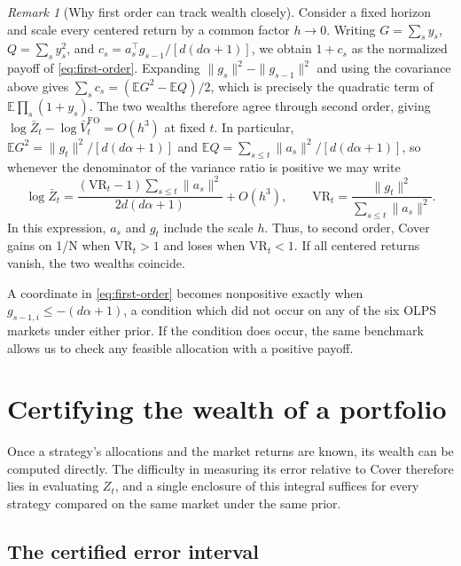 \documentclass{article}
\numberwithin{equation}{section}
\theoremstyle{remark}
\newtheorem{remark}[theorem]{Remark}
\newcommand{\E}{\mathbb E}
\begin{document}
\begin{remark}[Why first order can track wealth closely]
Consider a fixed horizon and scale every centered return by a common factor
$h\to0$. Writing $G=\sum_s y_s$, $Q=\sum_s y_s^2$, and
$c_s=a_s^\top g_{s-1}/[d(d\alpha+1)]$, we obtain $1+c_s$ as the
normalized payoff of \eqref{eq:first-order}. Expanding
$\|g_s\|^2-\|g_{s-1}\|^2$ and using the covariance above gives
$\sum_s c_s=(\E G^2-\E Q)/2$, which is precisely the quadratic term
of $\E\prod_s(1+y_s)$. The two wealths therefore agree through second
order, giving $\log\bar Z_t-\log\bar V_t^{\mathrm{FO}}=O(h^3)$ at
fixed $t$. In particular, $\E G^2=\|g_t\|^2/[d(d\alpha+1)]$ and
$\E Q=\sum_{s\le t}\|a_s\|^2/[d(d\alpha+1)]$, so whenever the
denominator of the variance ratio is positive we may write
\begin{equation}\label{eq:second-order}
 \log\bar Z_t =
 \frac{(\mathrm{VR}_t-1)\sum_{s\le t}\|a_s\|^2}{2d(d\alpha+1)}
 +O(h^3),\qquad
 \mathrm{VR}_t=\frac{\|g_t\|^2}{\sum_{s\le t}\|a_s\|^2}.
\end{equation}
In this expression, $a_s$ and $g_t$ include the scale $h$. Thus, to
second order, Cover gains on 1/N when $\mathrm{VR}_t>1$ and loses when $\mathrm{VR}_t<1$.
If all centered returns vanish, the two wealths coincide.
\end{remark}

A coordinate in \eqref{eq:first-order} becomes nonpositive exactly when
$g_{s-1,i}\le-(d\alpha+1)$, a condition which did not occur on any of
the six OLPS markets under either prior. If the condition does occur,
the same benchmark allows us to check any feasible allocation with a
positive payoff.

\section{Certifying the wealth of a portfolio}
\label{sec:certificate}

Once a strategy's allocations and the market returns are known, its
wealth can be computed directly. The difficulty in measuring its error
relative to Cover therefore lies in evaluating $Z_t$, and a single
enclosure of this integral suffices for every strategy compared on the
same market under the same prior.

\subsection{The certified error interval}
\end{document}
